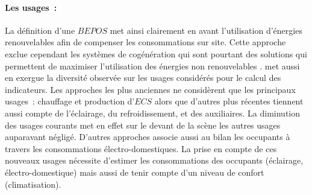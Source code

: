 \paragraph{Les usages~:} %
\label{par:les_usages}
La définition d’une $BEPOS$ met ainsi clairement en avant l’utilisation d’énergies
renouvelables afin de compenser les consommations sur site. Cette approche exclue
cependant les systèmes de cogénération qui sont pourtant des solutions qui permettent
de maximiser l’utilisation des énergies non renouvelables \parencite{Sartori2010}.
\textcite{Marszal2011971} met aussi en exergue la diversité observée sur les usages considérés pour le calcul
des indicateurs. Les approches les plus anciennes ne considèrent que les principaux usages~: chauffage
et production d’$ECS$ alors que d’autres plus récentes tiennent aussi compte de l’éclairage,
du refroidissement, et des auxiliaires. La diminution des usages courants met en effet
sur le devant de la scène les autres usages auparavant négligé. D’autres approches
associe aussi au bilan les occupants à travers les consommations électro-domestiques.
La prise en compte de ces nouveaux usages nécessite d’estimer les consommations des occupants
(éclairage, électro-domestique) mais aussi de tenir compte d’un niveau de confort (climatisation).


